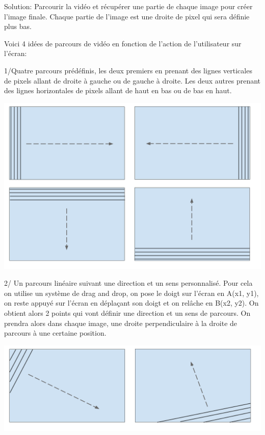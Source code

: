 \documentclass[a4paper,12pt]{report}
\begin{document}
\noindent Solution: Parcourir la vidéo et récupérer une partie de chaque image pour créer l'image finale.
Chaque partie de l'image est une droite de pixel qui sera définie plus bas.\bigskip

\noindent Voici 4 idées de parcours de vidéo en fonction de l’action de l’utilisateur sur l’écran:\par\bigskip

1/Quatre parcours prédéfinis, les deux premiers en prenant des lignes verticales de pixels allant de droite à gauche ou de gauche à droite.
Les deux autres prenant des lignes horizontales de pixels allant de haut en bas ou de bas en haut.
\begin{center}
 \includegraphics[scale=0.2]{./obturateur1.png}
\end{center}\newpage

2/ Un parcours linéaire suivant une direction et un sens personnalisé.
Pour cela on utilise un système de drag and drop, on pose le doigt sur l’écran en A(x1, y1), on reste appuyé sur l’écran en déplaçant son doigt et on relâche en B(x2, y2).
On obtient alors 2 points qui vont définir une direction et un sens de parcours.
On prendra alors dans chaque image, une droite perpendiculaire à la droite de parcours à une certaine position.
\begin{center}
 \includegraphics[scale=0.2]{./obturateur2.png}
\end{center}\par\bigskip
\end{document}
